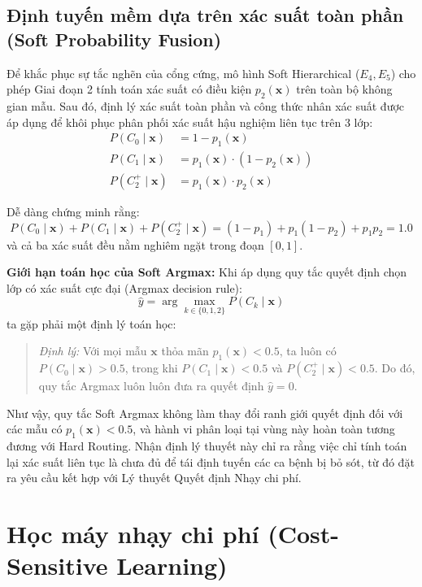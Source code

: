 \subsection{Định tuyến mềm dựa trên xác suất toàn phần (Soft Probability Fusion)}
Để khắc phục sự tắc nghẽn của cổng cứng, mô hình Soft Hierarchical ($E_4, E_5$) cho phép Giai đoạn 2 tính toán xác suất có điều kiện $p_2(\mathbf{x})$ trên toàn bộ không gian mẫu. Sau đó, định lý xác suất toàn phần và công thức nhân xác suất được áp dụng để khôi phục phân phối xác suất hậu nghiệm liên tục trên 3 lớp:
\begin{align}
    P(C_0 \mid \mathbf{x}) &= 1 - p_1(\mathbf{x}) \label{eq:soft-p0} \\
    P(C_1 \mid \mathbf{x}) &= p_1(\mathbf{x}) \cdot (1 - p_2(\mathbf{x})) \label{eq:soft-p1} \\
    P(C_2^+ \mid \mathbf{x}) &= p_1(\mathbf{x}) \cdot p_2(\mathbf{x}) \label{eq:soft-p2}
\end{align}

Dễ dàng chứng minh rằng:
\begin{equation}
    P(C_0 \mid \mathbf{x}) + P(C_1 \mid \mathbf{x}) + P(C_2^+ \mid \mathbf{x}) = (1 - p_1) + p_1(1 - p_2) + p_1 p_2 = 1.0
\end{equation}
và cả ba xác suất đều nằm nghiêm ngặt trong đoạn $[0, 1]$.

\textbf{Giới hạn toán học của Soft Argmax:} Khi áp dụng quy tắc quyết định chọn lớp có xác suất cực đại (Argmax decision rule):
\begin{equation}
    \hat{y} = \arg\max_{k \in \{0, 1, 2\}} P(C_k \mid \mathbf{x})
\end{equation}
ta gặp phải một định lý toán học:
\begin{quote}
\textit{Định lý:} Với mọi mẫu $\mathbf{x}$ thỏa mãn $p_1(\mathbf{x}) < 0.5$, ta luôn có $P(C_0 \mid \mathbf{x}) > 0.5$, trong khi $P(C_1 \mid \mathbf{x}) < 0.5$ và $P(C_2^+ \mid \mathbf{x}) < 0.5$. Do đó, quy tắc Argmax luôn luôn đưa ra quyết định $\hat{y} = 0$.
\end{quote}
Như vậy, quy tắc Soft Argmax không làm thay đổi ranh giới quyết định đối với các mẫu có $p_1(\mathbf{x}) < 0.5$, và hành vi phân loại tại vùng này hoàn toàn tương đương với Hard Routing. Nhận định lý thuyết này chỉ ra rằng việc chỉ tính toán lại xác suất liên tục là chưa đủ để tái định tuyến các ca bệnh bị bỏ sót, từ đó đặt ra yêu cầu kết hợp với Lý thuyết Quyết định Nhạy chi phí.

\section{Học máy nhạy chi phí (Cost-Sensitive Learning)}
\label{sec:ly-thuyet-cost-sensitive}

